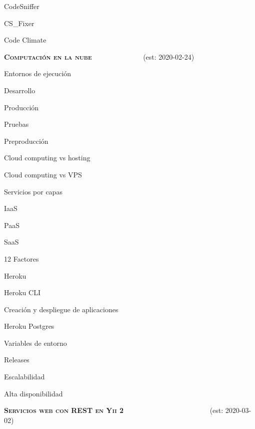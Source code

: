 \begin{longenum}
\begin{longenum}
        \begin{longenum}
            \item CodeSniffer
            \item CS\_Fixer
            \item Code Climate
        \end{longenum}
    \end{longenum}
    \item \textbf{\textsc{Computación en la nube}} \ \ \ \ \ \ \ \ \ \ \ \ \ \ (est: \mbox{2020-02-24})
    \begin{longenum}
        \item Entornos de ejecución
        \begin{longenum}
            \item Desarrollo
            \item Producción
            \item Pruebas
            \item Preproducción
        \end{longenum}
        \item Cloud computing vs hosting
        \item Cloud computing vs VPS
        \item Servicios por capas
        \begin{longenum}
            \item IaaS
            \item PaaS
            \item SaaS
        \end{longenum}
        \item 12 Factores
        \item Heroku
        \begin{longenum}
            \item Heroku CLI
            \item Creación y despliegue de aplicaciones
            \item Heroku Postgres
            \item Variables de entorno
            \item Releases
        \end{longenum}
        \item Escalabilidad \opcional\
        \item Alta disponibilidad \opcional\
    \end{longenum}
    \item \textbf{\textsc{Servicios web con REST en Yii 2}} \ \ \ \ \ \ \ \ \ \ \ \ \ \ \ \ \ \opcional\ \ \ \ \ \ \ (est: \mbox{2020-03-02})

\end{longenum}
